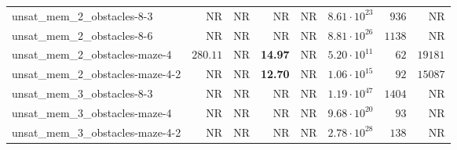 \begin{tabular}{lrrrrrrr}
unsat\_mem\_2\_obstacles-8-3 & NR & NR & NR & NR & $8.61\cdot 10^{23}$ & $936$ & NR \\
unsat\_mem\_2\_obstacles-8-6 & NR & NR & NR & NR & $8.81\cdot 10^{26}$ & $1138$ & NR \\
unsat\_mem\_2\_obstacles-maze-4 & $280.11$ & NR & \textbf{14.97} & NR & $5.20\cdot 10^{11}$ & $62$ & $19181$ \\
unsat\_mem\_2\_obstacles-maze-4-2 & NR & NR & \textbf{12.70} & NR & $1.06\cdot 10^{15}$ & $92$ & $15087$ \\
unsat\_mem\_3\_obstacles-8-3 & NR & NR & NR & NR & $1.19\cdot 10^{47}$ & $1404$ & NR \\
unsat\_mem\_3\_obstacles-maze-4 & NR & NR & NR & NR & $9.68\cdot 10^{20}$ & $93$ & NR \\
unsat\_mem\_3\_obstacles-maze-4-2 & NR & NR & NR & NR & $2.78\cdot 10^{28}$ & $138$ & NR \\
\bottomrule
\end{tabular}
